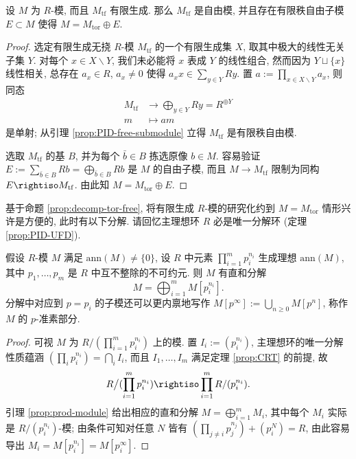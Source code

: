 \begin{proposition}\label{prop:decomp-tor-free}
	设 $M$ 为 $R$-模, 而且 $M_\text{tf}$ 有限生成. 那么 $M_\text{tf}$ 是自由模, 并且存在有限秩自由子模 $E \subset M$ 使得 $M = M_\text{tor} \oplus E$.
\end{proposition}
\begin{proof}
	选定有限生成无挠 $R$-模 $M_\text{tf}$ 的一个有限生成集 $X$, 取其中极大的线性无关子集 $Y$. 对每个 $x \in X \smallsetminus Y$, 我们未必能将 $x$ 表成 $Y$ 的线性组合, 然而因为 $Y \sqcup \{x\}$ 线性相关, 总存在 $a_x \in R$, $a_x \neq 0$ 使得 $a_x x \in \sum_{y \in Y} Ry$. 置 $a := \prod_{x \in X \smallsetminus Y} a_x$, 则同态
	\begin{align*}
		M_\text{tf} & \longrightarrow \bigoplus_{y \in Y} Ry = R^{\oplus Y} \\
		m & \longmapsto am
	\end{align*}
	是单射; 从引理 \ref{prop:PID-free-submodule} 立得 $M_\text{tf}$ 是有限秩自由模.

	选取 $M_\text{tf}$ 的基 $B$, 并为每个 $\bar{b} \in B$ 拣选原像 $b \in M$. 容易验证 $E := \sum_{\bar{b} \in B} Rb = \bigoplus_{\bar{b} \in B} Rb$ 是 $M$ 的自由子模, 而且 $M \to M_\text{tf}$ 限制为同构 $E \rightiso M_\text{tf}$. 由此知 $M = M_\text{tor} \oplus E$.
\end{proof}

基于命题 \ref{prop:decomp-tor-free}, 将有限生成 $R$-模的研究化约到 $M = M_\text{tor}$ 情形兴许是方便的, 此时有以下分解. 请回忆主理想环 $R$ 必是唯一分解环 (定理 \ref{prop:PID-UFD}).

\begin{lemma}\label{prop:PID-primary-decomp}
	假设 $R$-模 $M$ 满足 $\mathrm{ann}(M) \neq \{0\}$, 设 $R$ 中元素 $\prod_{i=1}^m p_i^{n_i}$ 生成理想 $\mathrm{ann}(M)$, 其中 $p_1, \ldots, p_m$ 是 $R$ 中互不整除的不可约元. 则 $M$ 有直和分解
	\[ M = \bigoplus_{i=1}^m M[p_i^{n_i}]. \]
	分解中对应到 $p = p_i$ 的子模还可以更内禀地写作 $M[p^\infty] := \bigcup_{n \geq 0} M[p^n]$, 称作 $M$ 的 $p$-准素部分. 
\end{lemma}
\begin{proof}
	可视 $M$ 为 $R/(\prod_{i=1}^m p_i^{n_i})$ 上的模. 置 $I_i := (p_i^{n_i})$, 主理想环的唯一分解性质蕴涵 $(\prod_i p_i^{n_i}) = \bigcap_i I_i$, 而且 $I_1, \ldots, I_m$ 满足定理 \ref{prop:CRT} 的前提, 故
	\[ R \big/ ( \prod_{i=1}^m p_i^{n_i} ) \rightiso \prod_{i=1}^m R/(p_i^{n_i}). \]
	引理 \ref{prop:prod-module} 给出相应的直和分解 $M = \bigoplus_{i=1}^m M_i$, 其中每个 $M_i$ 实际是 $R/(p_i^{n_i})$-模; 由条件可知对任意 $N$ 皆有 $(\prod_{j \neq i} p_j^{n_j}) + (p_i^N) = R$, 由此容易导出 $M_i = M[p_i^{n_i}] = M[p_i^{\infty}]$.
\end{proof}

